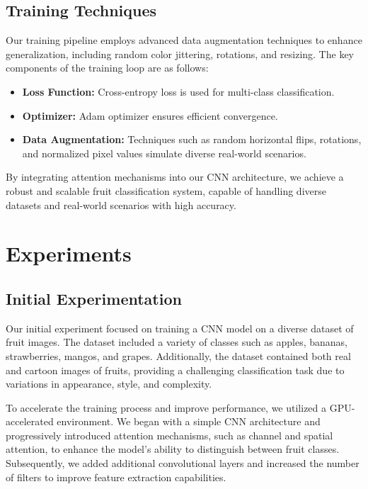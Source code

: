\documentclass{article}
\begin{document}
\subsection{Training Techniques}
Our training pipeline employs advanced data augmentation techniques to enhance generalization, including random color jittering, rotations, and resizing. The key components of the training loop are as follows:
\begin{itemize}
    \item \textbf{Loss Function:} Cross-entropy loss is used for multi-class classification.
    \item \textbf{Optimizer:} Adam optimizer ensures efficient convergence.
    \item \textbf{Data Augmentation:} Techniques such as random horizontal flips, rotations, and normalized pixel values simulate diverse real-world scenarios.
\end{itemize}

By integrating attention mechanisms into our CNN architecture, we achieve a robust and scalable fruit classification system, capable of handling diverse datasets and real-world scenarios with high accuracy.


\section{Experiments}

\subsection{Initial Experimentation}
Our initial experiment focused on training a CNN model on a diverse dataset of fruit images. The dataset included a variety of classes such as apples, bananas, strawberries, mangos, and grapes. Additionally, the dataset contained both real and cartoon images of fruits, providing a challenging classification task due to variations in appearance, style, and complexity.

To accelerate the training process and improve performance, we utilized a GPU-accelerated environment. We began with a simple CNN architecture and progressively introduced attention mechanisms, such as channel and spatial attention, to enhance the model's ability to distinguish between fruit classes. Subsequently, we added additional convolutional layers and increased the number of filters to improve feature extraction capabilities.
\end{document}
